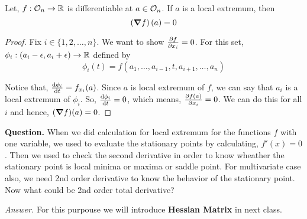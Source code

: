 \documentclass[../Analysis-3.tex]{subfiles}
\begin{document}
\begin{Thm}{}{}
    Let, $f: \mathcal{O}_{n} \to \mathbb{R}$ is differentiable at $a \in \mathcal{O}_{n}$. If $a$ is a local extremum, then \[ \left(\grad f\right)(a) = 0 \]
\end{Thm}

\begin{proof}
    Fix $i \in \{1,2, \ldots, n\}$. We want to show $\pdv{f}{x_i} = 0$. For this set, $\phi_i : (a_i - \epsilon, a_i + \epsilon) \to \mathbb{R}$ defined by $$ \phi_i(t) = f(a_1, \ldots, a_{i-1}, t, a_{i+1}, \ldots, a_n)$$

    Notice that, $\dv{\phi_i}{t}(a_i) = f_{x_i}(a)$. Since $a$ is local extremum of $f$, we can say that $a_i$ is a local extremum of $\phi_i$. So, $\dv{\phi_i}{t}(a_i) = 0$, which means, $\pdv{f(a)}{x_i} = 0$. We can do this for all $i$ and hence, $(\grad f)(a) = 0$.
\end{proof}


\textbf{Question.} When we did calculation for local extremum for the functions $f$ with one variable, we used to evaluate the stationary points by calculating, $f'(x) =0$. Then we used to check the second derivative in order to know wheather the stationary point is local minima or maxima or saddle point. For multivariate case also, we need 2nd order derivative to know the behavior of the stationary point. Now what could be 2nd order total derivative?

\vspace*{0.2cm}

\textit{Answer.} For this purpouse we will introduce \textbf{Hessian Matrix} in next class.
\end{document}
